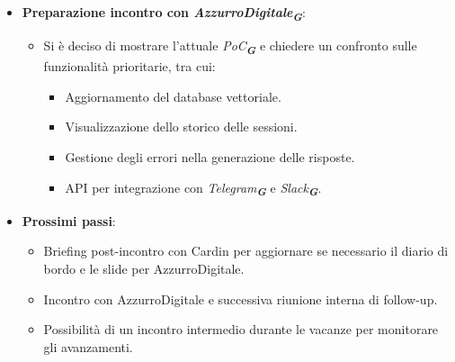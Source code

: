\begin{itemize}
    \item \textbf{Preparazione incontro con \emph{AzzurroDigitale}\textsubscript{\textit{\textbf{G}}}}:  
    \begin{itemize}
        \item Si è deciso di mostrare l'attuale \emph{PoC}\textsubscript{\textit{\textbf{G}}} e chiedere un confronto sulle funzionalità prioritarie, tra cui:  
        \begin{itemize}
            \item Aggiornamento del database vettoriale.  
            \item Visualizzazione dello storico delle sessioni.  
            \item Gestione degli errori nella generazione delle risposte.  
            \item API per integrazione con \emph{Telegram}\textsubscript{\textit{\textbf{G}}} e \emph{Slack}\textsubscript{\textit{\textbf{G}}}.  
        \end{itemize}
    \end{itemize}
    \item \textbf{Prossimi passi}:  
    \begin{itemize}
        \item Briefing post-incontro con Cardin per aggiornare se necessario il diario di bordo e le slide per AzzurroDigitale.  
        \item Incontro con AzzurroDigitale e successiva riunione interna di follow-up.  
        \item Possibilità di un incontro intermedio durante le vacanze per monitorare gli avanzamenti.  
    \end{itemize}
\end{itemize}
